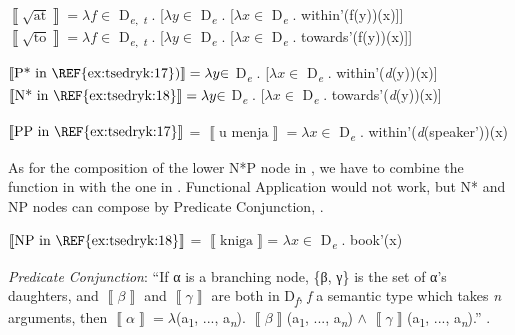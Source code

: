 \documentclass[output=paper,colorlinks,citecolor=brown,nonflat]{./langscibook}
\begin{document}
\ea%
    \label{ex:tsedryk:20}
    \ea\label{ex:tsedryk:20a}
    $\left\llbracket \sqrt{\text{at}}\right\rrbracket  = {\lambda}f {\in}$ D\textsubscript{{\textlangle}}\textit{\textsubscript{e}}\textsubscript{,} \textit{\textsubscript{t}}\textsubscript{{\textrangle}} . [${\lambda}y {\in}$ D\textit{\textsubscript{e}} . [${\lambda}x {\in}$ D\textit{\textsubscript{e}} . within'(f(y))(x)]]
    \ex\label{ex:tsedryk:20b}
    $\left\llbracket \sqrt{\text{to}}\right\rrbracket  = {\lambda}f {\in}$ D\textsubscript{{\textlangle}}\textit{\textsubscript{e}}\textsubscript{,} \textit{\textsubscript{t}}\textsubscript{{\textrangle}} . [${\lambda}y {\in}$ D\textit{\textsubscript{e}} . [${\lambda}x {\in}$ D\textit{\textsubscript{e}} . towards'(f(y))(x)]]
    \z
\z

\ea%
    \label{ex:tsedryk:21}
    \ea\label{ex:tsedryk:21a}
    $\left\llbracket \text{P* in \REF{ex:tsedryk:17}}\text )\right\rrbracket  = {\lambda}y {\in}$ D\textit{\textsubscript{e}}\textsubscript{} . [${\lambda}x {\in}$ D\textit{\textsubscript{e}} . within'(\textit{d}(y))(x)] 
    \ex\label{ex:tsedryk:21b}
    $\left\llbracket \text{N* in \REF{ex:tsedryk:18}}\right\rrbracket  = {\lambda}y {\in}$ D\textit{\textsubscript{e}} . [${\lambda}x {\in}$ D\textit{\textsubscript{e}} . towards'(\textit{d}(y))(x)]  
    \z
\z

\ea%
    \label{ex:tsedryk:22}
    $\left\llbracket \text{PP in \REF{ex:tsedryk:17}}\right\rrbracket $ =  $\left\llbracket \text{u menja}\right\rrbracket  = {\lambda}x {\in}$ D\textit{\textsubscript{e}} . within'(\textit{d}(speaker'))(x)
    \z

As for the composition of the lower N*P node in , we have to combine the function in  with the one in . Functional Application would not work, but N* and NP nodes can compose by Predicate Conjunction, .

\ea%
    \label{ex:tsedryk:23}
    $\left\llbracket \text{NP in \REF{ex:tsedryk:18}}\right\rrbracket $ =  $\left\llbracket \text{kniga}\right\rrbracket $= ${\lambda}x {\in}$ D\textit{\textsubscript{e}} . book'(x)
    \z

          

\ea%
    \label{ex:tsedryk:24}
    \textit{Predicate Conjunction}: “If α is a branching node, \{β, γ\} is the set of α’s daughters, and  $\left\llbracket \beta \right\rrbracket $  and  $\left\llbracket \gamma \right\rrbracket $  are both in D\textit{\textsubscript{f}}, \textit{f} a semantic type which takes \textit{n} arguments, then  $\left\llbracket \alpha \right\rrbracket  = {\lambda}$(a\textsubscript{1}, ..., a\textit{\textsubscript{n}}).  $\left\llbracket \beta \right\rrbracket $(a\textsubscript{1}, ..., a\textit{\textsubscript{n}}) ${\wedge}$  $\left\llbracket \gamma \right\rrbracket $(a\textsubscript{1}, ..., a\textit{\textsubscript{n}}).” \hfill \citep[41]{Myler2016}.
    \z
\end{document}
